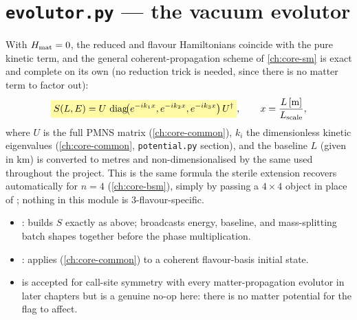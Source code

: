 \section{\texttt{evolutor.py} --- the vacuum evolutor}


\begin{theorybox}
With $H_{\rm mat}=0$, the reduced and flavour Hamiltonians coincide with
the pure kinetic term, and the general coherent-propagation scheme of
\cref{ch:core-sm} is exact and complete on its own (no reduction trick is
needed, since there is no matter term to factor out):
\begin{equation}
  \keyresult{S(L,E) = U\,\diag\!\bigl(e^{-ik_1x},e^{-ik_2x},e^{-ik_3x}\bigr)\,U^\dagger},
  \qquad x = \frac{L\,[\mathrm{m}]}{L_{\rm scale}},
\end{equation}
where $U$ is the full PMNS matrix (\cref{ch:core-common}), $k_i$ the
dimensionless kinetic eigenvalues (\cref{ch:core-common},
\texttt{potential.py} section), and the baseline $L$ (given in km) is
converted to metres and non-dimensionalised by the same
 used throughout the project. This is the same
formula the sterile extension recovers automatically for $n=4$
(\cref{ch:core-bsm}), simply by passing a $4\times4$ 
object in place of ; nothing in this module is
3-flavour-specific.
\end{theorybox}

\begin{implbox}
\begin{itemize}
  \item {}: builds
    $S$ exactly as above; broadcasts energy, baseline, and mass-splitting
    batch shapes together before the phase multiplication.
  \item {}:
    applies 
    (\cref{ch:core-common}) to a coherent flavour-basis initial state.
  \item {} is accepted for call-site symmetry with
    every matter-propagation evolutor in later chapters but is a genuine
    no-op here: there is no matter potential for the flag to affect.
\end{itemize}
\end{implbox}

